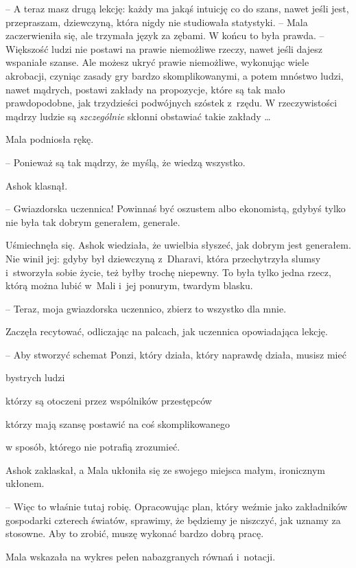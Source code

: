 \documentclass[oneside,polish,11pt,rmheadings]{mwbk}
\begin{document}
-- A teraz masz drugą lekcję: każdy ma jakąś intuicję co do szans, nawet jeśli jest, przepraszam, dziewczyną, która nigdy nie studiowała statystyki. -- Mala zaczerwieniła się, ale trzymała język za zębami. W końcu to była prawda. -- Większość ludzi nie postawi na prawie niemożliwe rzeczy, nawet jeśli dajesz wspaniałe szanse. Ale możesz ukryć prawie niemożliwe, wykonując wiele akrobacji, czyniąc zasady gry bardzo skomplikowanymi, a potem mnóstwo ludzi, nawet mądrych, postawi zakłady na propozycje, które są tak mało prawdopodobne, jak trzydzieści podwójnych szóstek z~rzędu. W rzeczywistości mądrzy ludzie są \textit{szczególnie }skłonni obstawiać takie zakłady \ldots 

Mala podniosła rękę. 

-- Ponieważ są tak mądrzy, że myślą, że wiedzą wszystko.

Ashok klasnął. 

-- Gwiazdorska uczennica! Powinnaś być oszustem albo ekonomistą, gdybyś tylko nie była tak dobrym generałem, generale. 

 Uśmiechnęła się. Ashok wiedziała, że uwielbia słyszeć, jak dobrym jest generałem. Nie winił jej: gdyby był dziewczyną z~Dharavi, która przechytrzyła slumsy i~stworzyła sobie życie, też byłby trochę niepewny. To była tylko jedna rzecz, którą można lubić w~Mali i~jej ponurym, twardym blasku. 
 
 -- Teraz, moja gwiazdorska uczennico, zbierz to wszystko dla mnie.

Zaczęła recytować, odliczając na palcach, jak uczennica opowiadająca lekcję. 

-- Aby stworzyć schemat Ponzi, który działa, który naprawdę działa, musisz mieć

\noindent bystrych ludzi

\noindent którzy są otoczeni przez wspólników przestępców

\noindent którzy mają szansę postawić na coś skomplikowanego

\noindent w sposób, którego nie potrafią zrozumieć.

Ashok zaklaskał, a Mala ukłoniła się ze swojego miejsca małym, ironicznym ukłonem.

-- Więc to właśnie tutaj robię. Opracowując plan, który weźmie jako zakładników gospodarki czterech światów, sprawimy, że będziemy je niszczyć, jak uznamy za stosowne. Aby to zrobić, muszę wykonać bardzo dobrą pracę. 

Mala wskazała na wykres pełen nabazgranych równań i~notacji. 
\end{document}
